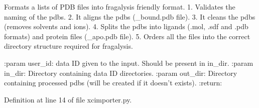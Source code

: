 \begin{DoxyVerb}Formats a lists of PDB files into fragalysis friendly format.
1. Validates the naming of the pdbs.
2. It aligns the pdbs (_bound.pdb file).
3. It cleans the pdbs (removes solvents and ions).
4. Splits the pdbs into ligands (.mol, .sdf and .pdb formats) and protein files (_apo.pdb file).
5. Orders all the files into the correct directory structure required for fragalysis.

:param user_id: data ID given to the input. Should be present in in_dir.
:param in_dir: Directory containing data ID directories.
:param out_dir: Directory containing processed pdbs (will be created if it doesn't exists).
:return:
\end{DoxyVerb}
 

Definition at line 14 of file xcimporter.\+py.


